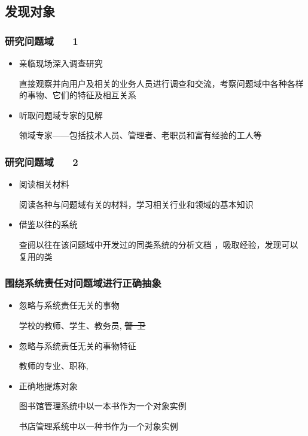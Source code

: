 \documentclass[compress]{beamer}
\begin{document}
  \subsection{发现对象}

  \begin{frame}
    \frametitle{研究问题域 ~~ 1} 
    \begin{itemize}
      \item 亲临现场深入调查研究

    直接观察并向用户及相关的业务人员进行调查和交流，考察问题域中各种各样
    的事物、它们的特征及相互关系 
  \item  听取问题域专家的见解

    领域专家——包括技术人员、管理者、老职员和富有经验的工人等

\end{itemize}
  \end{frame}

  \begin{frame}
    \frametitle{研究问题域 ~~ 2}
    \begin{itemize}
  \item  阅读相关材料

    阅读各种与问题域有关的材料，学习相关行业和领域的基本知识
  \item  借鉴以往的系统

    查阅以往在该问题域中开发过的同类系统的分析文档 ，吸取经验，发现可以
    复用的类
\end{itemize}
\end{frame}

\begin{frame}[shrink=10]
  \frametitle{围绕系统责任对问题域进行正确抽象}
  \begin{itemize}
    \item<1-> 忽略与系统责任无关的事物
  \begin{example}
    学校的教师、学生、教务员,   {\color{gray} \sout{\mbox{警
    卫}}}
\end{example}

  \item<3-> 忽略与系统责任无关的事物特征
  \begin{example}
    教师的专业、职称,  
\end{example}

  \item<5-> 正确地提炼对象  
  \begin{example}
    图书馆管理系统中以\alert{一本书}作为一个对象实例

    书店管理系统中以\alert{一种书}作为一个对象实例
\end{example}
\end{itemize}
\end{frame}
\end{document}
